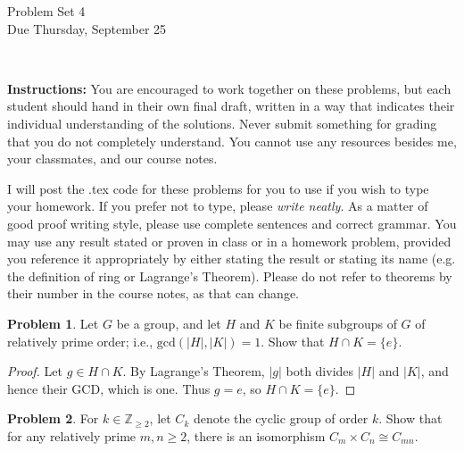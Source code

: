 \documentclass[11pt]{article}
\title{}
\date{\vspace{-0.5in}}
\theoremstyle{definition}
\newtheorem{problem}{Problem}
\begin{document}
\thispagestyle{fancy}
\pagestyle{fancy}

\vspace{3em}

\begin{center}
	{\LARGE Problem Set 4 \\}
	Due Thursday, September 25
\end{center}

\

\noindent
{\bf Instructions:}
You are encouraged to work together on these problems, but each student should hand in their own final draft, written in a way that indicates their individual understanding of the solutions. Never submit something for grading that you do not completely understand. You cannot use any resources besides me, your classmates, and our course notes.


I will post the .tex code for these problems for you to use if you wish to type your homework. If you prefer not to type, please  {\em write neatly}. As a matter of good proof writing style, please use complete sentences and correct grammar. You may use any result stated or proven in class or in a homework problem, provided you reference it appropriately by either stating the result or stating its name (e.g. the definition of ring or Lagrange's Theorem). Please do not refer to theorems by their number in the course notes, as that can change.


\smallskip



\begin{problem} 
Let $G$ be a group, and let $H$ and $K$ be finite subgroups of $G$ of relatively prime order; i.e., $\mathrm{gcd}(|H|, |K|) = 1$. Show that $H \cap K = \{e\}$.
\end{problem} 

	\begin{proof}
	Let $g\in H\cap K$. By Lagrange's Theorem, $|g|$ both divides $|H|$ and $|K|$, and hence their GCD, which is one. Thus $g=e$, so $H\cap K=\{e\}$.
	\end{proof}


\begin{problem} 
For $k\in \mathbb{Z}_{\geq 2}$, let $C_k$ denote the cyclic group of order $k$. Show that for any relatively prime $m,n\geq 2$, there is an isomorphism $C_m \times C_n \cong C_{mn}$.
\end{problem} 
\end{document}
